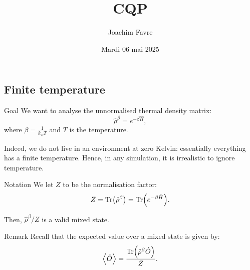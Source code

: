 \documentclass[a4paper]{article}
\title{CQP}
\author{Joachim Favre}
\date{Mardi 06 mai 2025}
\begin{document}
\maketitle


\subsection{Finite temperature}

\begin{parag}{Goal}
    We want to analyse the unnormalised thermal density matrix: 
    \[\hat{\rho}^{\beta} = e^{-\beta \hat{H}},\]
    where $\beta = \frac{1}{k_B T}$ and $T$ is the temperature.

    Indeed, we do not live in an environment at zero Kelvin: essentially everything has a finite temperature. Hence, in any simulation, it is irrealistic to ignore temperature.

    \begin{subparag}{Notation}
        We let $Z$ to be the normalisation factor: 
        \[Z = \Tr\left(\hat{\rho}^{\beta}\right) = \Tr\left(e^{-\beta \hat{H}}\right).\]

        Then, $\hat{\rho}^{\beta} / Z$ is a valid mixed state.
    \end{subparag}

    \begin{subparag}{Remark}
        Recall that the expected value over a mixed state is given by: 
        \[\left\langle \hat{O} \right\rangle = \frac{\Tr\left(\hat{\rho}^{\beta} \hat{O}\right)}{Z}.\]
    \end{subparag}
\end{parag}
\end{document}
